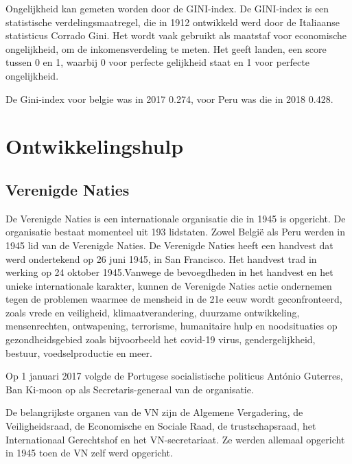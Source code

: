 Ongelijkheid kan gemeten worden door de GINI-index. De GINI-index is een statistische verdelingsmaatregel, die in 1912 ontwikkeld werd door de Italiaanse statisticus Corrado Gini. Het wordt vaak gebruikt als maatstaf voor economische ongelijkheid, om de inkomensverdeling te meten. Het geeft landen, een score tussen 0 en 1, waarbij 0 voor perfecte gelijkheid staat en 1 voor perfecte ongelijkheid.  \autocite{Chappelow2020}

De Gini-index voor belgie was in 2017 0.274, voor Peru was die in 2018 0.428. \autocite{Bank2018}


\section{Ontwikkelingshulp}

\subsection{Verenigde Naties}
De Verenigde Naties is een internationale organisatie die in 1945 is opgericht. De organisatie bestaat momenteel uit 193 lidstaten. Zowel België als Peru werden in 1945 lid van de Verenigde Naties. De Verenigde Naties heeft een handvest dat werd ondertekend op 26 juni 1945, in San Francisco. Het handvest trad in werking op 24 oktober 1945.Vanwege de bevoegdheden in het handvest en het unieke internationale karakter, kunnen de Verenigde Naties actie ondernemen tegen de problemen waarmee de mensheid in de 21e eeuw wordt geconfronteerd, zoals vrede en veiligheid, klimaatverandering, duurzame ontwikkeling, mensenrechten, ontwapening, terrorisme, humanitaire hulp en noodsituaties op gezondheidsgebied zoals bijvoorbeeld het covid-19 virus, gendergelijkheid, bestuur, voedselproductie en meer. \autocite{Nations2020}

Op 1 januari 2017 volgde de Portugese socialistische politicus António Guterres, Ban Ki-moon op als Secretaris-generaal van de organisatie. 

De belangrijkste organen van de VN zijn de Algemene Vergadering, de Veiligheidsraad, de Economische en Sociale Raad, de trustschapsraad, het Internationaal Gerechtshof en het VN-secretariaat. Ze werden allemaal opgericht in 1945 toen de VN zelf werd opgericht. 

